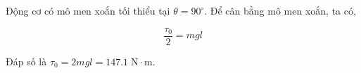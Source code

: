 \begin{solution}
    Động cơ có mô men xoắn tối thiểu tại $\theta=90^{\circ}$. Để cân bằng mô men xoắn, ta có,

    $$\frac{\tau_0}{2}=mgl$$

    Đáp số là $\boxed{\tau_0=2mgl=147.1\;\mathrm{N\cdot m}}$.
\end{solution}